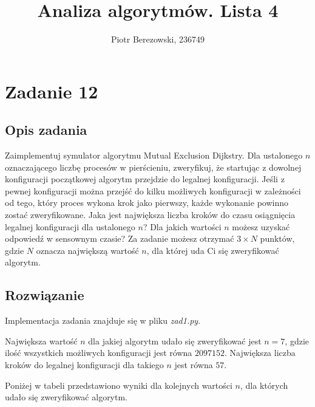 \documentclass{article}
\title{Analiza algorytmów. Lista 4}
\author{Piotr Berezowski, 236749}
\begin{document}
	\maketitle
	\newpage
    

	\section{Zadanie 12}
	\subsection{Opis zadania}
    Zaimplementuj symulator algorytmu Mutual Exclusion Dijkstry. Dla ustalonego $n$ oznaczającego liczbę procesów w pierścieniu, zweryfikuj, 
    że startując z dowolnej konfiguracji początkowej algorytm przejdzie do legalnej konfiguracji. Jeśli z pewnej konfiguracji można przejść 
    do kilku możliwych konfiguracji w zależności od tego, który proces wykona krok jako pierwszy, każde wykonanie powinno zostać zweryfikowane. 
    Jaka jest największa liczba kroków do czasu osiągnięcia legalnej konfiguracji dla ustalonego $n$? Dla jakich wartości $n$ możesz uzyskać 
    odpowiedź w sensownym czasie? Za zadanie możesz otrzymać $3 \times N$ punktów, gdzie $N$ oznacza największą wartość $n$, dla której uda Ci się 
    zweryfikować algorytm.
    
    \subsection{Rozwiązanie}

    Implementacja zadania znajduje się w pliku \textit{zad1.py}. 

    Największa wartość $n$ dla jakiej algorytm udało się zweryfikować jest $n = 7$, gdzie ilość wszystkich możliwych konfiguracji 
    jest równa $2097152$. Największa liczba kroków do legalnej konfiguracji dla takiego 
    $n$ jest równa $57$.

    Poniżej w tabeli przedstawiono wyniki dla kolejnych wartości $n$, dla których udało się zweryfikować algorytm.
\end{document}
